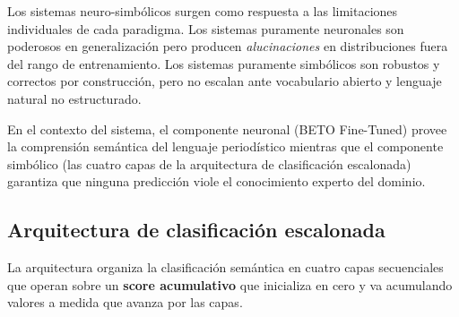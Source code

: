 Los sistemas neuro-simbólicos surgen como respuesta a las limitaciones individuales
de cada paradigma. Los sistemas puramente neuronales son poderosos en generalización
pero producen \textit{alucinaciones} en distribuciones fuera del rango de entrenamiento.
Los sistemas puramente simbólicos son robustos y correctos por construcción, pero
no escalan ante vocabulario abierto y lenguaje natural no estructurado.

En el contexto del sistema, el componente neuronal (BETO Fine-Tuned) provee la
comprensión semántica del lenguaje periodístico mientras que el componente simbólico
(las cuatro capas de la arquitectura de clasificación escalonada) garantiza
que ninguna predicción viole el conocimiento experto del dominio.


\subsection{Arquitectura de clasificación escalonada}
\label{subsec:mt_scoring}


La arquitectura organiza la clasificación semántica en cuatro capas secuenciales
que operan sobre un \textbf{score acumulativo} que inicializa en cero y va
acumulando valores a medida que avanza por las capas.

